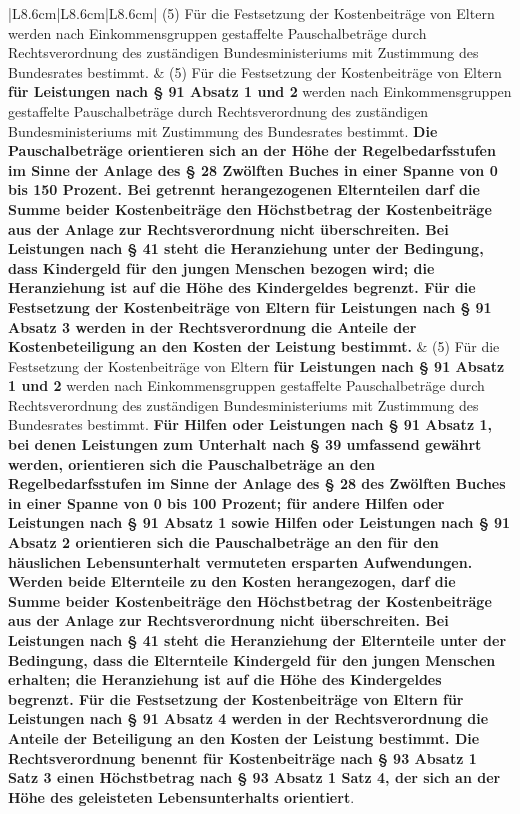 \documentclass[10pt,a4paper,landscape]{article}
\begin{document}
\begin{longtable}{|L{8.6cm}|L{8.6cm}|L{8.6cm}|}
\hline
(5) Für die Festsetzung der Kostenbeiträge von Eltern werden nach Einkommensgruppen gestaffelte Pauschalbeträge durch Rechtsverordnung des zuständigen Bundesministeriums mit Zustimmung des Bundesrates bestimmt. & (5) Für die Festsetzung der Kostenbeiträge von Eltern \textbf{für Leistungen nach \S{} 91 Absatz 1 und 2} werden nach Einkommensgruppen gestaffelte Pauschalbeträge durch Rechtsverordnung des zuständigen Bundesministeriums mit Zustimmung des Bundesrates bestimmt. \textbf{Die Pauschalbeträge orientieren sich an der Höhe der Regelbedarfsstufen im Sinne der Anlage des \S{} 28 Zwölften Buches in einer Spanne von 0 bis 150 Prozent. Bei getrennt herangezogenen Elternteilen darf die Summe beider Kostenbeiträge den Höchstbetrag der Kostenbeiträge aus der Anlage zur Rechtsverordnung nicht überschreiten. Bei Leistungen nach \S{} 41 steht die Heranziehung unter der Bedingung, dass Kindergeld für den jungen Menschen bezogen wird; die Heranziehung ist auf die Höhe des Kindergeldes begrenzt. Für die Festsetzung der Kostenbeiträge von Eltern für Leistungen nach \S{} 91 Absatz 3 werden in der Rechtsverordnung die Anteile der Kostenbeteiligung an den Kosten der Leistung bestimmt.} & (5) Für die Festsetzung der Kostenbeiträge von Eltern \textbf{für Leistungen nach \S{} 91 Absatz 1 und 2} werden nach Einkommensgruppen gestaffelte Pauschalbeträge durch Rechtsverordnung des zuständigen Bundesministeriums mit Zustimmung des Bundesrates bestimmt. \textbf{Für Hilfen oder Leistungen nach \S{} 91 Absatz 1, bei denen Leistungen zum Unterhalt nach \S{} 39 umfassend gewährt werden, orientieren sich die Pauschalbeträge an den Regelbedarfsstufen im Sinne der Anlage des \S{} 28 des Zwölften Buches in einer Spanne von 0 bis 100 Prozent; für andere Hilfen oder Leistungen nach \S{} 91 Absatz 1 sowie Hilfen oder Leistungen nach \S{} 91 Absatz 2 orientieren sich die Pauschalbeträge an den für den häuslichen Lebensunterhalt vermuteten ersparten Aufwendungen. Werden beide Elternteile zu den Kosten herangezogen, darf die Summe beider Kostenbeiträge den Höchstbetrag der Kostenbeiträge aus der Anlage zur Rechtsverordnung nicht überschreiten. Bei Leistungen nach \S{} 41 steht die Heranziehung der Elternteile unter der Bedingung, dass die Elternteile Kindergeld für den jungen Menschen erhalten; die Heranziehung ist auf die Höhe des Kindergeldes begrenzt. Für die Festsetzung der Kostenbeiträge von Eltern für Leistungen nach \S{} 91 Absatz 4 werden in der Rechtsverordnung die Anteile der Beteiligung an den Kosten der Leistung bestimmt. Die Rechtsverordnung benennt für Kostenbeiträge nach \S{} 93 Absatz 1 Satz 3 einen Höchstbetrag nach \S{} 93 Absatz 1 Satz 4, der sich an der Höhe des geleisteten Lebensunterhalts orientiert}. \\

\end{longtable}
\end{document}
